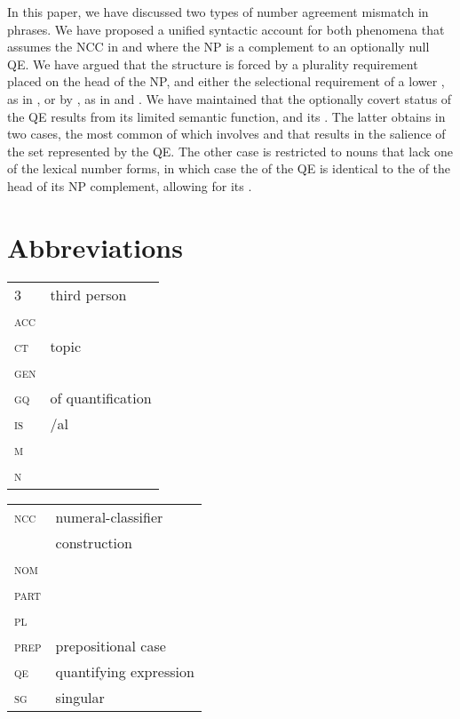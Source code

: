 \documentclass[output=paper,modfonts,newtxmath,hidelinks]{langscibook}
\begin{document}
In this paper, we have discussed two types of number agreement mismatch in   phrases. We have proposed a unified syntactic account for both phenomena that assumes the NCC in  and  where the  NP is a complement to an optionally null QE. We have argued that the structure is forced by a plurality requirement placed on the head of the NP, and either the selectional requirement of a lower , as in , or by , as in  and . We have maintained that the optionally covert status of the QE results from its limited semantic function, and its . The latter obtains in two cases, the most common of which involves   and   that results in the salience of the set represented by the QE. The other case is restricted to nouns that lack one of the lexical number forms, in which case the  of the QE is identical to the  of the head of its NP complement, allowing for its . 


\section*{Abbreviations}

\begin{tabularx}{.5\textwidth}{@{}lQ@{}}
\textsc{3}&third person\\
\textsc{acc}&\\
\textsc{ct}& topic\\
\textsc{gen}&\\
\textsc{gq}& of quantification\\
\textsc{is}&/al\\
\textsc{m}&\\
\textsc{n}&\\
\end{tabularx}%
\begin{tabularx}{.5\textwidth}{@{}lQ@{}}
\textsc{ncc}&numeral-classifier\\
&construction\\
\textsc{nom}&\\
\textsc{part}&\\
\textsc{pl}&\\
\textsc{prep}&prepositional case\\
\textsc{qe}&quantifying expression\\
\textsc{sg}&singular\\
\end{tabularx}
\end{document}
